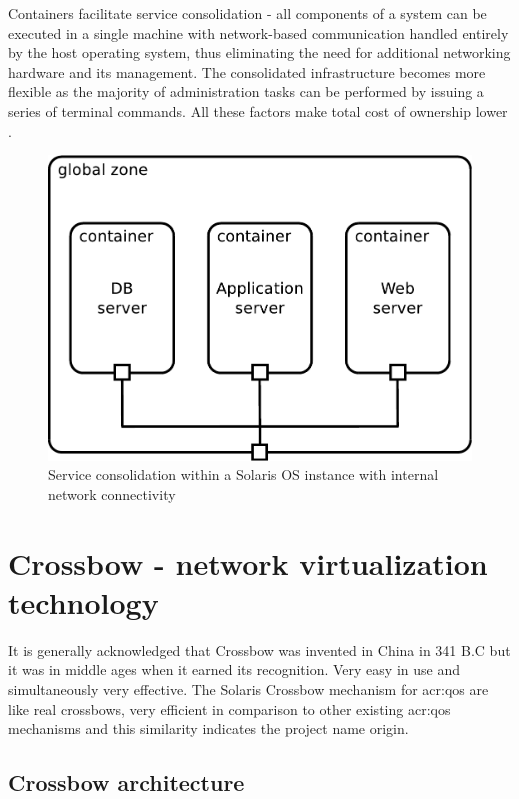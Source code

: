\documentclass[11pt,openany]{book}
\begin{document}
        Containers facilitate service consolidation - all components of a system can be executed in a single machine
        with network-based communication handled entirely by the host operating system, thus eliminating the need for
        additional networking hardware and its management. The consolidated infrastructure becomes more flexible as the
        majority of administration tasks can be performed by issuing a series of terminal commands. All these factors
        make total cost of ownership lower \cite{price}.

        \begin{figure}[H]
          \begin{center}
            \includegraphics[width=.6\textwidth]{img/solaris/consolidation.pdf}
          \end{center}

          \caption{Service consolidation within a Solaris OS instance with internal network connectivity}
        \end{figure}


    \section{Crossbow - network virtualization technology}
    \label{sec:sol:xbow}

      It is generally acknowledged that Crossbow was invented in China in 341 B.C but it was in middle ages when it
      earned its recognition. Very easy in use and simultaneously very effective. The Solaris Crossbow mechanism for
      \gls{acr:qos} are like real crossbows, very efficient in comparison to other existing \gls{acr:qos} mechanisms and
      this similarity indicates the project name origin.


      \subsection{Crossbow architecture}
\end{document}

